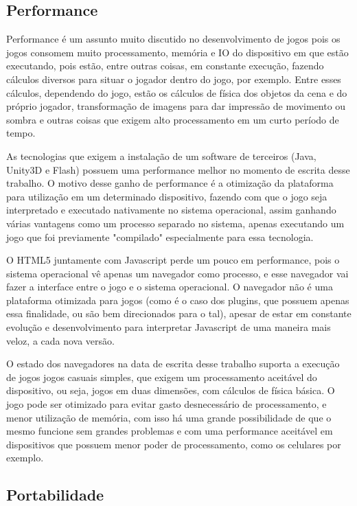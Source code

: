 \subsection{Performance}

Performance é um assunto muito discutido no desenvolvimento de jogos
pois os jogos consomem muito processamento, memória e IO do dispositivo em que estão
executando, pois estão, entre outras coisas, em constante execução, fazendo
cálculos diversos para situar o jogador dentro do jogo, por exemplo.
Entre esses cálculos, dependendo do jogo, estão os cálculos de física dos
objetos da cena e do próprio jogador, transformação de imagens para
dar impressão de movimento ou sombra e outras coisas que exigem alto
processamento em um curto período de tempo.

As tecnologias que exigem a instalação de um software de terceiros
(Java, Unity3D e Flash) possuem uma performance melhor no
momento de escrita desse trabalho. O motivo desse ganho de performance
é a otimização da plataforma para utilização em um determinado
dispositivo, fazendo com que o jogo seja interpretado e executado
nativamente no sistema operacional, assim ganhando várias
vantagens como um processo separado no sistema, apenas executando um
jogo que foi previamente "compilado" especialmente para essa tecnologia.

O HTML5 juntamente com Javascript perde um pouco em performance, pois
o sistema operacional vê apenas um navegador como processo, e esse
navegador vai fazer a interface entre o jogo e o sistema operacional.
O navegador não é uma plataforma otimizada para jogos (como é o caso
dos plugins, que possuem apenas essa finalidade, ou são bem
direcionados para o tal), apesar de estar em constante evolução e
desenvolvimento para interpretar Javascript de uma maneira mais veloz,
a cada nova versão.

O estado dos navegadores na data de escrita desse
trabalho suporta a execução de jogos jogos casuais simples, que exigem
um processamento aceitável do dispositivo, ou seja, jogos em duas
dimensões, com cálculos de física básica. O jogo pode ser otimizado
para evitar gasto desnecessário de processamento, e menor utilização
de memória, com isso há uma grande possibilidade de que o mesmo
funcione sem grandes problemas e com uma performance aceitável em dispositivos
que possuem menor poder de processamento, como os celulares por exemplo.

\subsection{Portabilidade}

